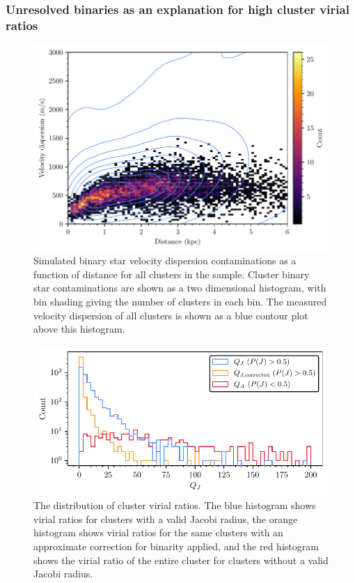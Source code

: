\subsubsection{Unresolved binaries as an explanation for high cluster virial ratios}

\begin{figure}[t]
    \centering
    \includegraphics[width=\textwidth]{fig/c4/dispersion_binaries.pdf}
    \caption[Simulated binary star velocity dispersion contaminations as a function of distance for all clusters in the sample]{Simulated binary star velocity dispersion contaminations as a function of distance for all clusters in the sample. Cluster binary star contaminations are shown as a two dimensional histogram, with bin shading giving the number of clusters in each bin. The measured velocity dispersion of all clusters is shown as a blue contour plot above this histogram.}
    \label{fig:dynamics:velocities:binary_contamination}
\end{figure}

\begin{figure}[t]
    \centering
    \includegraphics[width=\textwidth]{fig/c4/results_q_distribution.pdf}
    \caption[The distribution of cluster virial ratios]{The distribution of cluster virial ratios. The blue histogram shows virial ratios for clusters with a valid Jacobi radius, the orange histogram shows virial ratios for the same clusters with an approximate correction for binarity applied, and the red histogram shows the virial ratio of the entire cluster for clusters without a valid Jacobi radius.}
    \label{fig:dynamics:results:virial_ratio_distribution}
\end{figure}

